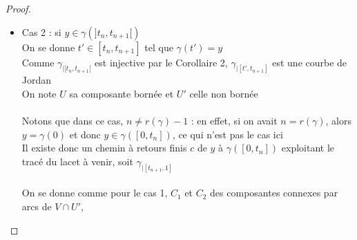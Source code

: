 \documentclass{article}
\begin{document}
\begin{flushleft}
\begin{proof}
\begin{itemize}
        Par la Proposition 10, $\operatorname{Fr}(C_1) \cap \gamma(]t_n, t_{n+1}[) \neq \varnothing$ et de même pour $C_2$\\
        On se donne alors $t \leq t' \in ]t_n, t_{n+1}[$ tels que $\gamma(t)$ et $\gamma(t')$ appartiennent respectivement à ces
        intersections\\
        Comme $\gamma([t, t']) \subset V$ et est compact, on se donne $r > 0$ tel que pour tout point de $\gamma([t, t'])$,
        la boule centrée en ce point de rayon $r$ est incluse dans $V$\\
        Comme $\gamma(t)$ et $\gamma(t')$ sont des points frontière, il existe dans tout voisinage de ces points respectivement des
        points de $C_1$ ou $C_2$\\
        Par ce qui precède et la Proposition 7, il existe donc un chemin dans $V \cap U$ de $C_1$ à $C_2$ et donc $C_1 = C_2$\\
        $V \cap U$ est bien connexe par arcs et par le même raisonnement $V \cap U'$ également
        \\~\\
        Par la Proposition 5, comme ce sont des ouverts connexes par arc formant une partition de $V \backslash \gamma([t_n, t_{n+1}])$, il s'agit
        de ses composantes connexes par arc
        \\~\\
        \item Cas 2 : si $y \in \gamma(]t_n, t_{n+1}[)$\\
        On se donne $t' \in [t_n, t_{n+1}]$ tel que $\gamma(t') = y$\\
        Comme $\gamma_{\mid [t_n, t_{n+1}[}$ est injective par le Corollaire 2, $\gamma_{\mid [t', t_{n+1}]}$ est une courbe de Jordan\\
        On note $U$ sa composante bornée et $U'$ celle non bornée
        \\~\\
        Notons que dans ce cas, $n \neq r(\gamma)-1$ : en effet, si on avait $n = r(\gamma)$, alors $y = \gamma(0)$
        et donc $y \in \gamma([0, t_n])$, ce qui n'est pas le cas ici\\
        Il existe donc un chemin à retours finis $c$ de $y$ à $\gamma([0, t_n])$ exploitant le tracé du lacet à venir, soit
        $\gamma_{\mid [t_{n+1}, 1]}$
        \\~\\
        On se donne comme pour le cas 1, $C_1$ et $C_2$ des composantes connexes par arcs de $V \cap U'$,

\end{itemize}
\end{proof}
\end{flushleft}
\end{document}
